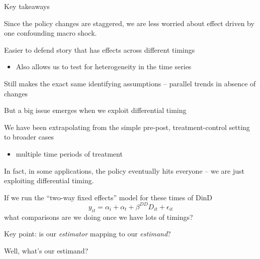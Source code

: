 \documentclass[notes,11pt, aspectratio=169]{beamer}
\newenvironment{wideitemize}{\itemize\addtolength{\itemsep}{10pt}}{\enditemize}
\begin{document}
\begin{frame}{Key takeaways}
  \begin{wideitemize}

  \item Since the policy changes are staggered, we are less worried about effect driven by one confounding macro shock.
  \item Easier to defend story that has effects across different timings
    \begin{itemize}
    \item Also allows us to test for heterogeneity in the time series
    \end{itemize}
  \item Still makes the exact same identifying assumptions -- parallel
    trends in absence of changes
  \end{wideitemize}
\end{frame}



\begin{frame}{But a big issue emerges when we exploit differential timing}
  \begin{wideitemize}
  \item We have been extrapolating from the simple pre-post,
    treatment-control setting to broader cases
    \begin{itemize}
    \item multiple time periods of treatment
    \end{itemize}
  \item In fact, in some applications, the policy eventually hits everyone --
    we are just exploiting differential timing.
  \item If we run the ``two-way fixed effects'' model for these times of DinD
    \begin{equation}
      y_{it} = \alpha_{i} + \alpha_{t} + \beta^{DD}D_{it} + \epsilon_{it}
    \end{equation}
    what comparisons are we doing once we have lots of timings?
  \item Key point: is our \emph{estimator} mapping to our \emph{estimand}?
  \item Well, what's our estimand?
\end{wideitemize}
\end{frame}
\end{document}
